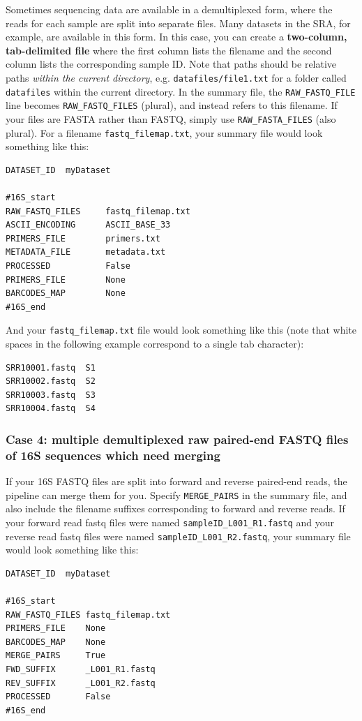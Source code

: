 \documentclass[11pt, oneside]{article}   	%
\begin{document}
Sometimes sequencing data are available in a demultiplexed form, where the reads for each sample are split into separate files.  Many datasets in the SRA, for example, are available in this form.  In this case, you can create a \textbf{two-column, tab-delimited file} where the first column lists the filename and the second column lists the corresponding sample ID.  Note that paths should be relative paths \textit{within the current directory}, e.g. {\tt datafiles/file1.txt} for a folder called {\tt datafiles} within the current directory.  In the summary file, the {\tt RAW\_FASTQ\_FILE} line becomes {\tt RAW\_FASTQ\_FILES} (plural), and instead refers to this filename.  If your files are FASTA rather than FASTQ, simply use {\tt RAW\_FASTA\_FILES} (also plural).  For a filename {\tt fastq\_filemap.txt}, your summary file would look something like this:

\begin{verbatim}
DATASET_ID	myDataset

#16S_start
RAW_FASTQ_FILES     fastq_filemap.txt
ASCII_ENCODING      ASCII_BASE_33
PRIMERS_FILE        primers.txt
METADATA_FILE       metadata.txt
PROCESSED           False
PRIMERS_FILE        None
BARCODES_MAP        None
#16S_end
\end{verbatim}

And your {\tt fastq\_filemap.txt} file would look something like this (note that white spaces in the following example correspond to a single tab character):

\begin{verbatim}
SRR10001.fastq	S1
SRR10002.fastq	S2
SRR10003.fastq	S3
SRR10004.fastq	S4
\end{verbatim}

\subsubsection{Case 4: multiple demultiplexed raw paired-end FASTQ files of 16S sequences which need merging}\label{sec:case4}
If your 16S FASTQ files are split into forward and reverse paired-end reads, the pipeline can merge them for you. Specify {\tt MERGE\_PAIRS} in the summary file, and also include the filename suffixes corresponding to forward and reverse reads. If your forward read fastq files were named {\tt sampleID\_L001\_R1.fastq} and your reverse read fastq files were named {\tt sampleID\_L001\_R2.fastq}, your summary file would look something like this:

\begin{verbatim}
DATASET_ID	myDataset

#16S_start
RAW_FASTQ_FILES fastq_filemap.txt
PRIMERS_FILE    None
BARCODES_MAP    None
MERGE_PAIRS	    True
FWD_SUFFIX      _L001_R1.fastq
REV_SUFFIX      _L001_R2.fastq
PROCESSED       False
#16S_end
\end{verbatim}
\end{document}
